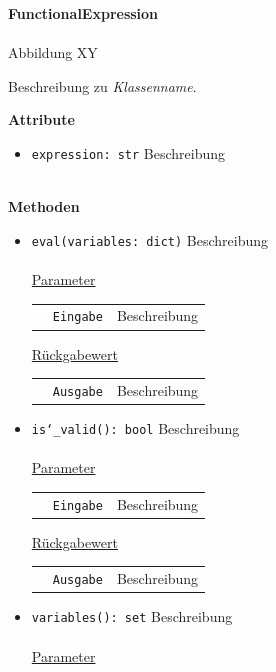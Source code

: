 \documentclass{article}
\begin{document}
\newpage
\textbf{\large{FunctionalExpression}}\\\\
Abbildung XY

Beschreibung zu \textit{Klassenname}.
\newline \newline

\textbf{{Attribute}}
\begin{itemize}
\item \texttt{expression: str} \newline Beschreibung
\\\\
\end{itemize}

\textbf{{Methoden}}
\begin{itemize}
\item \texttt{eval(variables: dict)} \newline Beschreibung
\\\\
\underline{{Parameter}}

\begin{tabular}{lll}
 & \texttt{Eingabe} & Beschreibung \\
\end{tabular}

\underline{{Rückgabewert}}

\begin{tabular}{lll}
 & \texttt{Ausgabe} & Beschreibung \\
\end{tabular}

\item \texttt{is\char`_valid(): bool} \newline Beschreibung
\\\\
\underline{{Parameter}}

\begin{tabular}{lll}
 & \texttt{Eingabe} & Beschreibung \\
\end{tabular}

\underline{{Rückgabewert}}

\begin{tabular}{lll}
 & \texttt{Ausgabe} & Beschreibung \\
\end{tabular}

\item \texttt{variables(): set} \newline Beschreibung
\\\\
\underline{{Parameter}}


\end{itemize}
\end{document}
